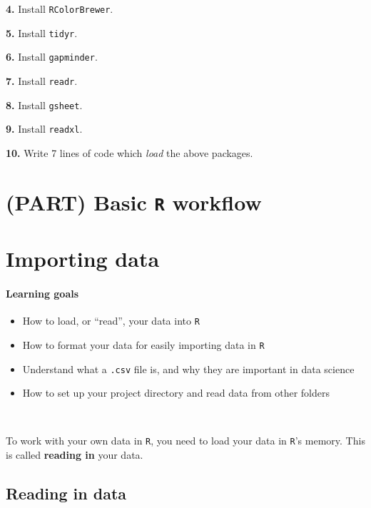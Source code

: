 \documentclass[
]{book}
\providecommand{\tightlist}{%
  \setlength{\itemsep}{0pt}\setlength{\parskip}{0pt}}
\begin{document}
\textbf{4.} Install \texttt{RColorBrewer}.

\textbf{5.} Install \texttt{tidyr}.

\textbf{6.} Install \texttt{gapminder}.

\textbf{7.} Install \texttt{readr}.

\textbf{8.} Install \texttt{gsheet}.

\textbf{9.} Install \texttt{readxl}.

\textbf{10.} Write 7 lines of code which \emph{load} the above packages.

\hypertarget{part-basic-r-workflow}{%
\chapter*{\texorpdfstring{(PART) Basic \texttt{R} workflow}{(PART) Basic R workflow}}\label{part-basic-r-workflow}}

\hypertarget{importing-data}{%
\chapter{Importing data}\label{importing-data}}

\hypertarget{learning-goals-4}{%
\subsubsection*{Learning goals}\label{learning-goals-4}}

\begin{itemize}
\tightlist
\item
  How to load, or ``read'', your data into \texttt{R}
\item
  How to format your data for easily importing data in \texttt{R}
\item
  Understand what a \texttt{.csv} file is, and why they are important in data science
\item
  How to set up your project directory and read data from other folders
\end{itemize}

~

To work with your own data in \texttt{R}, you need to load your data in \texttt{R}'s memory. This is called \textbf{reading in} your data.

\hypertarget{reading-in-data}{%
\section*{Reading in data}\label{reading-in-data}}
\end{document}
